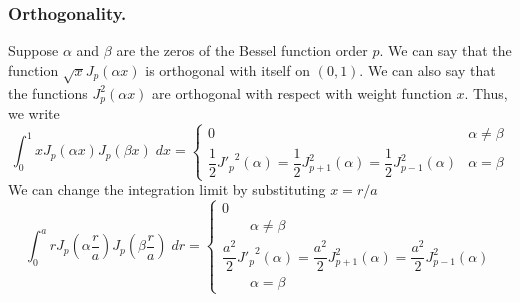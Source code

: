 \documentclass[../main.tex]{subfiles}
\begin{document}
\subsubsection*{Orthogonality.} Suppose $\alpha$ and $\beta$ are the zeros of the Bessel function order $p$.
We can say that the function $\sqrt{x}J_p(\alpha x)$ is orthogonal with itself on $(0,1)$.
We can also say that the functions $J_p^2(\alpha x)$ are orthogonal with respect with weight function $x$.
Thus, we write
\begin{equation*}
    \int_{0}^{1}xJ_p(\alpha x)J_p(\beta x)\;dx=\begin{cases}
        0                                                                                         & \alpha\neq \beta \\
        \dfrac{1}{2}{J'_p}^2(\alpha)=\dfrac{1}{2}J_{p+1}^2(\alpha) =\dfrac{1}{2}J_{p-1}^2(\alpha) & \alpha=\beta
    \end{cases}
\end{equation*}
We can change the integration limit by substituting $x=r/a$
\begin{equation*}
    \int_{0}^{a}rJ_p\left(\alpha \frac{r}{a}\right)J_p\left(\beta \frac{r}{a}\right)\;dr=\begin{cases}
        0                                                                                               \\
        \qquad \alpha\neq \beta                                                                         \\
        \dfrac{a^2}{2}{J'_p}^2(\alpha)=\dfrac{a^2}{2}J_{p+1}^2(\alpha) =\dfrac{a^2}{2}J_{p-1}^2(\alpha) \\
        \qquad\alpha=\beta
    \end{cases}
\end{equation*}
\end{document}
